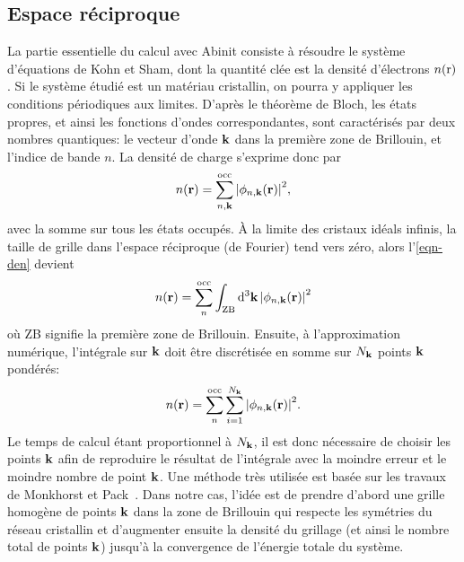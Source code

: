 \subsection{Espace réciproque}
\label{subsec-reciprocal}
La partie essentielle du calcul avec Abinit consiste à résoudre le système d'équations de Kohn et Sham,
dont la quantité clée est la densité d'électrons $n(\textnormal{r})$.
Si le système étudié est un matériau cristallin,
on pourra y appliquer les conditions périodiques aux limites.
D'après le théorème de Bloch, les états propres, et ainsi les fonctions d'ondes correspondantes,
sont caractérisés par deux nombres quantiques:
le vecteur d'onde $\vb{k}$ dans la première zone de Brillouin, et l'indice de bande $n$.
La densité de charge s'exprime donc par
\begin{equation}
  \label{eqn-den}
  n(\vb{r}) = \sum_{n, \vb{k}}^{\textnormal{occ}}\abs{\phi_{n, \vb{k}}(\vb{r})}^2,
\end{equation}
avec la somme sur tous les états occupés.
À la limite des cristaux idéals infinis, la taille de grille dans l'espace réciproque (de Fourier) tend vers zéro,
alors l'\cref{eqn-den} devient
\begin{equation*}
  n(\vb{r}) = \sum_n^{\textnormal{occ}}\int_{\textnormal{ZB}}\dd[3]{\vb{k}}\abs{\phi_{n, \vb{k}}(\vb{r})}^2
\end{equation*}
où ZB signifie la première zone de Brillouin. Ensuite, à l'approximation numérique,
l'intégrale sur $\vb{k}$ doit être discrétisée en somme sur $N_{\vb{k}}$ points $\vb{k}$ pondérés:
\begin{equation*}
  n(\vb{r}) = \sum_n^{\textnormal{occ}}\sum_{i=1}^{N_{\vb{k}}}\abs{\phi_{n, \vb{k}}(\vb{r})}^2.
\end{equation*}
Le temps de calcul étant proportionnel à $N_{\vb{k}}$,
il est donc nécessaire de choisir les points $\vb{k}$ afin de reproduire le résultat
de l'intégrale avec la moindre erreur et le moindre nombre de point $\vb{k}$.
Une méthode très utilisée est basée sur les travaux de Monkhorst et Pack~\cite{Monkhorst1976}.
Dans notre cas,
l'idée est de prendre d'abord une grille homogène de points $\vb{k}$ dans la zone de Brillouin
qui respecte les symétries du réseau cristallin et d'augmenter ensuite la densité du grillage (et ainsi le nombre total de points $\vb{k}$)
jusqu'à la convergence de l'énergie totale du système.

